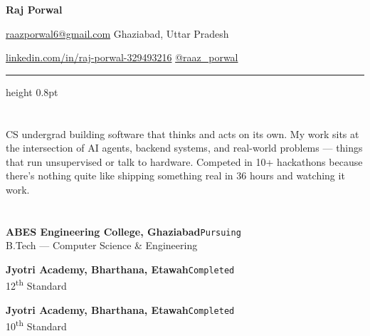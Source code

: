 \documentclass[10pt, a4paper]{article}
\newcommand{\edentry}[3]{%
  \vspace{3pt}%
  \textbf{#1}\hfill{\texttt{\relsize{-2}\color{faint}#3}}\\[-1pt]
  {\small\color{mid}#2}%
  \vspace{3pt}%
}
\begin{document}

{\LARGE\textbf{Raj Porwal}}

\vspace{5pt}

{\small\color{mid}%
  \href{mailto:raazporwal6@gmail.com}{raazporwal6@gmail.com}%
  \enspace\textbullet{}%
  \enspace\textbullet\enspace Ghaziabad, Uttar Pradesh%
}

{\small\color{mid}%
  \href{https://linkedin.com/in/raj-porwal-329493216}{linkedin.com/in/raj-porwal-329493216}%
  \enspace\textbullet\enspace%
  \href{https://twitter.com/raaz_porwal}{@raaz\_porwal}%
}

\vspace{5pt}
{\color{rule}\hrule height 0.8pt}
\vspace{10pt}

\section{}

CS undergrad building software that thinks and acts on its own. My work sits at the intersection of AI agents, backend systems, and real-world problems --- things that run unsupervised or talk to hardware. Competed in 10+ hackathons because there's nothing quite like shipping something real in 36 hours and watching it work.

\section{}

\edentry{ABES Engineering College, Ghaziabad}{B.Tech --- Computer Science \& Engineering}{Pursuing}
\edentry{Jyotri Academy, Bharthana, Etawah}{12\textsuperscript{th} Standard}{Completed}
\edentry{Jyotri Academy, Bharthana, Etawah}{10\textsuperscript{th} Standard}{Completed}

\section{}
\end{document}
